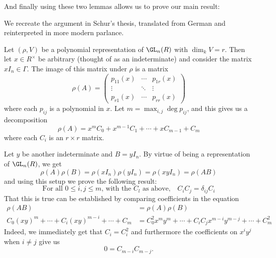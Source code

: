 \documentclass[12pt]{article}
\begin{document}
And finally using these two lemmas allows us to prove our main result:
\begin{prf}
	We recreate the argument in Schur's thesis, translated from German and reinterpreted in more modern parlance. 
	
	Let $(\rho,V)$ be a polynomial representation of $\GL_n(R)$ with $\dim_k V=r$. Then let $x\in R^\times$ be arbitrary (thought of as an indeterminate)
	and consider the matrix $xI_n\in\Gamma$. The image of this matrix under $\rho$ is a matrix 
	\[\rho(A)=\begin{pmatrix}
		p_{11}(x) & \cdots & p_{1r}(x)\\
		\vdots & \ddots & \vdots\\
		p_{r1}(x) & \cdots & p_{rr}(x)
	\end{pmatrix}\]
	where each $p_{ij}$ is a polynomial in $x$. Let $m=\max_{i,j}\deg p_{ij}$, and this gives us a decomposition 
	\[\rho(A)=x^m C_0+x^{m-1}C_1+\cdots+ xC_{m-1}+C_m\]
	where each $C_i$ is an $r\times r$ matrix.

	Let $y$ be another indeterminate and $B=yI_n$. By virtue of being a representation of $\GL_n(R)$, we get 
	\[\rho(A)\rho(B)=\rho(xI_n)\rho(yI_n)=\rho(xyI_n)=\rho(AB)\]
	and using this setup we prove the following result: 
	\[\text{For all $0\le i,j\le m$, with the $C_l$ as above,}\quad C_iC_j=\delta_{ij}C_i\]
	That this is true can be established by comparing coefficients in the equation
	\begin{align*}
		\rho(AB)&=\rho(A)\rho(B)\\
		C_0(xy)^m+\cdots+C_i(xy)^{m-i}+\cdots+C_m&=C_0^2x^my^m+\cdots+C_iC_jx^{m-i}y^{m-j}+\cdots+C_m^2
	\end{align*}
	Indeed, we immediately get that $C_i=C_i^2$ and furthermore the coefficients on $x^iy^j$ when $i\ne j$ give us
	\[0=C_{m-i}C_{m-j}.\]
	

\end{prf}
\end{document}
